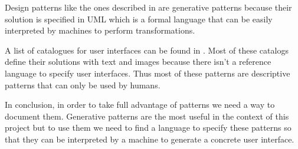 Design patterns like the ones described in \cite{Design_Patterns} are generative patterns because their solution is specified in UML which is a formal language that can be easily interpreted by machines to perform transformations.

A list of catalogues for user interfaces can be found in \cite{The_Interaction_Design_Patterns_Page}. Most of these catalogs define their solutions with text and images because there isn't a reference language to specify user interfaces. Thus most of these patterns are descriptive patterns that can only be used by humans.

In conclusion, in order to take full advantage of patterns we need a way to document them. Generative patterns are the most useful in the context of this project but to use them we need to find a language to specify these patterns so that they can be interpreted by a machine to generate a concrete user interface.